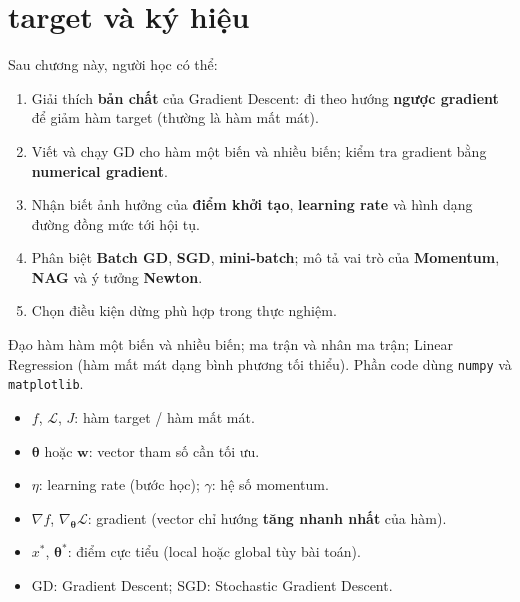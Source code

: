 \section*{target và ký hiệu}

\begin{phuongphap}[title={target học tập}]
Sau chương này, người học có thể:
\begin{enumerate}
  \item Giải thích \textbf{bản chất} của Gradient Descent: đi theo hướng \textbf{ngược gradient} để giảm hàm target (thường là hàm mất mát).
  \item Viết và chạy GD cho hàm một biến và nhiều biến; kiểm tra gradient bằng \textbf{numerical gradient}.
  \item Nhận biết ảnh hưởng của \textbf{điểm khởi tạo}, \textbf{learning rate} và hình dạng đường đồng mức tới hội tụ.
  \item Phân biệt \textbf{Batch GD}, \textbf{SGD}, \textbf{mini-batch}; mô tả vai trò của \textbf{Momentum}, \textbf{NAG} và ý tưởng \textbf{Newton}.
  \item Chọn điều kiện dừng phù hợp trong thực nghiệm.
\end{enumerate}
\end{phuongphap}

\begin{luuy}[title={Kiến thức tiên quyết}]
Đạo hàm hàm một biến và nhiều biến; ma trận và nhân ma trận; Linear Regression (hàm mất mát dạng bình phương tối thiểu). Phần code dùng \texttt{numpy} và \texttt{matplotlib}.
\end{luuy}

\begin{phuongphap}[title={Ký hiệu thống nhất}]
\begin{itemize}
  \item $f$, $\mathcal{L}$, $J$: hàm target / hàm mất mát.
  \item $\boldsymbol{\theta}$ hoặc $\mathbf{w}$: vector tham số cần tối ưu.
  \item $\eta$: learning rate (bước học); $\gamma$: hệ số momentum.
  \item $\nabla f$, $\nabla_{\boldsymbol{\theta}}\mathcal{L}$: gradient (vector chỉ hướng \textbf{tăng nhanh nhất} của hàm).
  \item $x^*$, $\boldsymbol{\theta}^*$: điểm cực tiểu (local hoặc global tùy bài toán).
  \item GD: Gradient Descent; SGD: Stochastic Gradient Descent.
\end{itemize}
\end{phuongphap}

